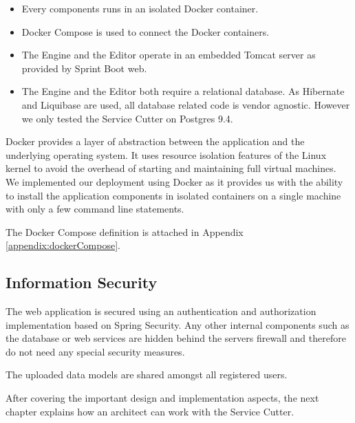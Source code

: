 \begin{itemize}
\item Every components runs in an isolated Docker\cite{docker} container.
\item Docker Compose\cite{dockercompose} is used to connect the Docker containers.
\item The Engine and the Editor operate in an embedded Tomcat\cite{tomcat} server as provided by Sprint Boot web.
\item The Engine and the Editor both require a relational database. As Hibernate\cite{hibernate} and Liquibase\cite{liquibase} are used, all database related code is vendor agnostic. However we only tested the Service Cutter on Postgres 9.4\cite{postgres}.
\end{itemize}

Docker provides a layer of abstraction between the application and the underlying operating system. It uses resource isolation features of the Linux kernel to avoid the overhead of starting and maintaining full virtual machines. We implemented our deployment using Docker as it provides us with the ability to install the application components in isolated containers on a single machine with only a few command line statements.

The Docker Compose definition is attached in Appendix \ref{appendix:dockerCompose}.


\subsection{Information Security}

The web application is secured using an authentication and authorization implementation based on Spring Security\cite{springSecurity}. Any other internal components such as the database or web services are hidden behind the servers firewall and therefore do not need any special security measures.

The uploaded data models are shared amongst all registered users.


\bigskip
After covering the important design and implementation aspects, the next chapter explains how an architect can work with the Service Cutter.
